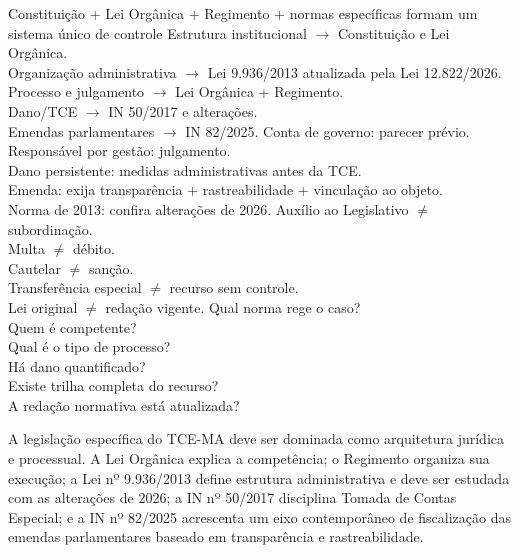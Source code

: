 {Constituição + Lei Orgânica + Regimento + normas específicas formam um sistema único de controle}
{Estrutura institucional $\rightarrow$ Constituição e Lei Orgânica.\\Organização administrativa $\rightarrow$ Lei 9.936/2013 atualizada pela Lei 12.822/2026.\\Processo e julgamento $\rightarrow$ Lei Orgânica + Regimento.\\Dano/TCE $\rightarrow$ IN 50/2017 e alterações.\\Emendas parlamentares $\rightarrow$ IN 82/2025.}
{Conta de governo: parecer prévio.\\Responsável por gestão: julgamento.\\Dano persistente: medidas administrativas antes da TCE.\\Emenda: exija transparência + rastreabilidade + vinculação ao objeto.\\Norma de 2013: confira alterações de 2026.}
{Auxílio ao Legislativo $\neq$ subordinação.\\Multa $\neq$ débito.\\Cautelar $\neq$ sanção.\\Transferência especial $\neq$ recurso sem controle.\\Lei original $\neq$ redação vigente.}
{Qual norma rege o caso?\\Quem é competente?\\Qual é o tipo de processo?\\Há dano quantificado?\\Existe trilha completa do recurso?\\A redação normativa está atualizada?}

\begin{resumo}
A legislação específica do TCE-MA deve ser dominada como arquitetura jurídica e processual. A Lei Orgânica explica a competência; o Regimento organiza sua execução; a Lei nº 9.936/2013 define estrutura administrativa e deve ser estudada com as alterações de 2026; a IN nº 50/2017 disciplina Tomada de Contas Especial; e a IN nº 82/2025 acrescenta um eixo contemporâneo de fiscalização das emendas parlamentares baseado em transparência e rastreabilidade.
\end{resumo}
